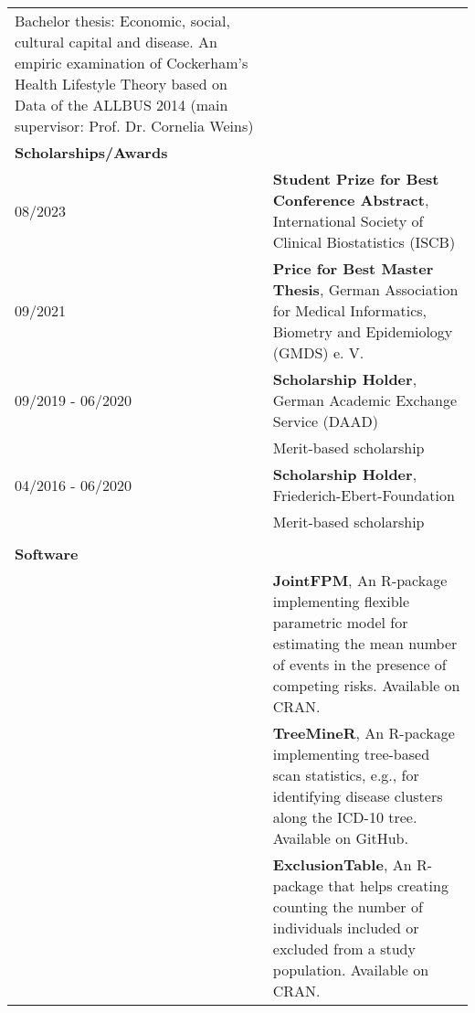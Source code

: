 \documentclass[11pt, a4paper]{article}
\begin{document}
\begin{longtable}{p{4cm}p{12cm}}
		Bachelor thesis: Economic, social, cultural capital and disease. An empiric examination of Cockerham’s Health Lifestyle Theory based on Data of the ALLBUS 2014 (main supervisor: Prof. Dr. Cornelia Weins) \newline                                                									\\ 
				
		\textbf{Scholarships/Awards} 		& 																    \\ \hline
		08/2023 & \textbf{Student Prize for Best Conference Abstract}, International Society of Clinical Biostatistics (ISCB) \\
		09/2021 & \textbf{Price for Best Master Thesis}, German Association for Medical Informatics, Biometry and Epidemiology (GMDS) e. V.\\ 
		09/2019 - 06/2020			& \textbf{Scholarship Holder}, German Academic Exchange Service (DAAD) 		\\
		& Merit-based scholarship                                               								\\
		04/2016 - 06/2020			& \textbf{Scholarship Holder}, Friederich-Ebert-Foundation 					\\
		& Merit-based scholarship                                               								\\													                								
		
		&																										\\ 
		
		\textbf{Software}  		&																			\\ \hline
		 & \textbf{JointFPM}, An R-package implementing flexible parametric model for estimating the mean number of events in the presence of competing risks. Available on CRAN.	\\ 
		 & \textbf{TreeMineR}, An R-package implementing tree-based scan statistics, e.g., for identifying disease clusters along the ICD-10 tree. Available on GitHub. \\ 
		 & \textbf{ExclusionTable}, An R-package that helps creating counting the number of individuals included or excluded from a study population. Available on CRAN. \\ 


\end{longtable}
\end{document}
